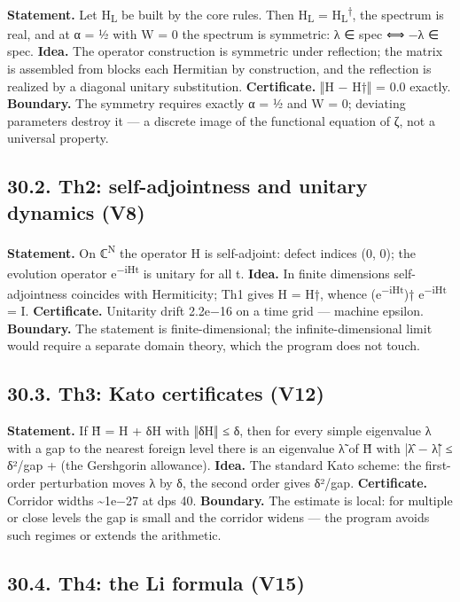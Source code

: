 \documentclass[11pt,a4paper]{article}
\begin{document}
\textbf{Statement.} Let H\textsubscript{L} be built by the core rules. Then H\textsubscript{L} = H\textsubscript{L}\textsuperscript{†}, the spectrum is real, and at α = ½ with W = 0 the spectrum is symmetric: λ ∈ spec ⟺ −λ ∈ spec. \textbf{Idea.} The operator construction is symmetric under reflection; the matrix is assembled from blocks each Hermitian by construction, and the reflection is realized by a diagonal unitary substitution. \textbf{Certificate.} ‖H − H†‖ = 0.0 exactly. \textbf{Boundary.} The symmetry requires exactly α = ½ and W = 0; deviating parameters destroy it — a discrete image of the functional equation of ζ, not a universal property.

\subsection{30.2. Th2: self-adjointness and unitary dynamics (V8)}

\textbf{Statement.} On ℂ\textsuperscript{N} the operator H is self-adjoint: defect indices (0, 0); the evolution operator e\textsuperscript{−iHt} is unitary for all t. \textbf{Idea.} In finite dimensions self-adjointness coincides with Hermiticity; Th1 gives H = H†, whence (e\textsuperscript{−iHt})† e\textsuperscript{−iHt} = I. \textbf{Certificate.} Unitarity drift 2.2e−16 on a time grid — machine epsilon. \textbf{Boundary.} The statement is finite-dimensional; the infinite-dimensional limit would require a separate domain theory, which the program does not touch.

\subsection{30.3. Th3: Kato certificates (V12)}

\textbf{Statement.} If H̃ = H + δH with ‖δH‖ ≤ δ, then for every simple eigenvalue λ with a gap to the nearest foreign level there is an eigenvalue λ̃ of H̃ with |λ̂ − λ̃| ≤ δ²/gap + (the Gershgorin allowance). \textbf{Idea.} The standard Kato scheme: the first-order perturbation moves λ by δ, the second order gives δ²/gap. \textbf{Certificate.} Corridor widths \textasciitilde{}1e−27 at dps 40. \textbf{Boundary.} The estimate is local: for multiple or close levels the gap is small and the corridor widens — the program avoids such regimes or extends the arithmetic.

\subsection{30.4. Th4: the Li formula (V15)}
\end{document}
